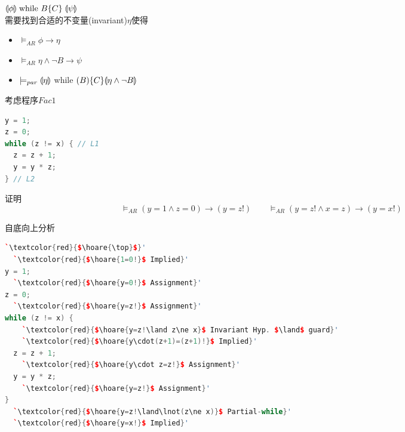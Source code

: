 $\llparenthesis \phi\rrparenthesis\;\text{while }B\{C\}\;\llparenthesis \psi\rrparenthesis$\\
需要找到合适的不变量(invariant)$\eta$使得
\begin{itemize}
	\item $\models_{AR}\phi\to\eta$
	\item $\models_{AR}\eta\land\lnot B\to\psi$
	\item $\models_{par}\llparenthesis \eta\rrparenthesis$ while $(B)\{C\}\llparenthesis \eta\land\lnot B\rrparenthesis$
\end{itemize}
\begin{example}
考虑程序$Fac1$
\begin{lstlisting}[language=c++]
y = 1;
z = 0;
while (z != x) { // L1
  z = z + 1;
  y = y * z;
} // L2
\end{lstlisting}
证明
\[\models_{AR}(y=1\land z=0)\to(y=z!)\qquad
\models_{AR}(y=z!\land x=z)\to(y=x!)\]
\end{example}
\begin{analysis}
自底向上分析
\begin{lstlisting}[language=c++]
  `\textcolor{red}{$\hoare{\top}$}'
  `\textcolor{red}{$\hoare{1=0!}$ Implied}'
y = 1;
  `\textcolor{red}{$\hoare{y=0!}$ Assignment}'
z = 0;
  `\textcolor{red}{$\hoare{y=z!}$ Assignment}'
while (z != x) {
    `\textcolor{red}{$\hoare{y=z!\land z\ne x}$ Invariant Hyp. $\land$ guard}'
    `\textcolor{red}{$\hoare{y\cdot(z+1)=(z+1)!}$ Implied}'
  z = z + 1;
    `\textcolor{red}{$\hoare{y\cdot z=z!}$ Assignment}'
  y = y * z;
    `\textcolor{red}{$\hoare{y=z!}$ Assignment}'
}
  `\textcolor{red}{$\hoare{y=z!\land\lnot(z\ne x)}$ Partial-while}'
  `\textcolor{red}{$\hoare{y=x!}$ Implied}'
\end{lstlisting}
\end{analysis}